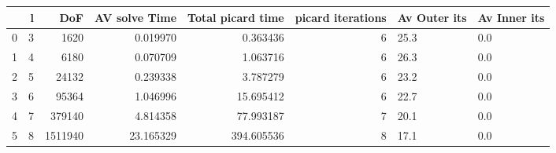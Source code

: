 \begin{tabular}{lrrrrrll}
\toprule
{} &  l &      DoF &  AV solve Time &  Total picard time &  picard iterations & Av Outer its & Av Inner its \\
\midrule
0 &  3 &     1620 &       0.019970 &           0.363436 &                  6 &         25.3 &          0.0 \\
1 &  4 &     6180 &       0.070709 &           1.063716 &                  6 &         26.3 &          0.0 \\
2 &  5 &    24132 &       0.239338 &           3.787279 &                  6 &         23.2 &          0.0 \\
3 &  6 &    95364 &       1.046996 &          15.695412 &                  6 &         22.7 &          0.0 \\
4 &  7 &   379140 &       4.814358 &          77.993187 &                  7 &         20.1 &          0.0 \\
5 &  8 &  1511940 &      23.165329 &         394.605536 &                  8 &         17.1 &          0.0 \\
\bottomrule
\end{tabular}
